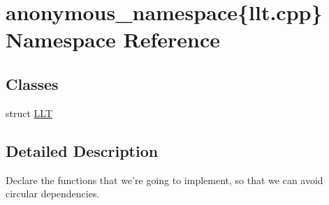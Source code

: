 \hypertarget{namespaceanonymous__namespace_02llt_8cpp_03}{\section{anonymous\-\_\-namespace\{llt.\-cpp\} Namespace Reference}
\label{namespaceanonymous__namespace_02llt_8cpp_03}
}
\subsection*{Classes}
\begin{DoxyCompactItemize}
\item 
struct \hyperlink{structanonymous__namespace_02llt_8cpp_03_1_1LLT}{L\-L\-T}
\end{DoxyCompactItemize}


\subsection{Detailed Description}
Declare the functions that we're going to implement, so that we can avoid circular dependencies. 